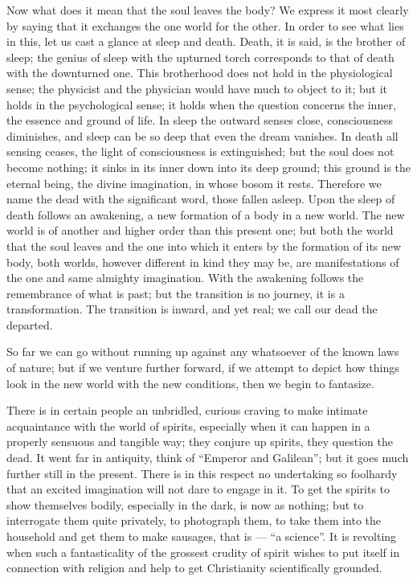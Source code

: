 \documentclass[12pt,a4paper,openany]{book}
\newcommand{\opage}[1]{\marginnote{\footnotesize\textit{[#1]}}}
\begin{document}
Now what does it mean that the soul leaves the body? We express it most clearly by saying that it exchanges the one
world for the other. In order to see what lies in this, let us cast a glance at sleep and death. Death, it is said, is
the brother of sleep; the genius of sleep with the upturned torch corresponds to that of death with the downturned one.
This brotherhood does not hold in the physiological sense; the physicist and the physician would have much to object to
it; but it holds in the psychological sense; it holds when the question concerns the inner, the essence and ground of
life. In sleep the outward senses close, consciousness diminishes, and sleep can be so deep that even the dream
vanishes. In death all sensing ceases, the light of consciousness is extinguished; but the soul does not become
nothing; it sinks in its inner down into its deep ground; this ground is the eternal being, the divine imagination, in
whose bosom it rests. Therefore we name the dead with the significant word, those fallen asleep. Upon the sleep of death
follows an awakening, a new formation of a body in a new world. The new world is of another and higher order than this
present one;
\setcounter{footnote}{0}%
\opage{25}but both the world that the soul leaves and the one into which it enters by the formation of its new body,
both worlds, however different in kind they may be, are manifestations of the one and same almighty imagination. With
the awakening follows the remembrance of what is past; but the transition is no journey, it is a transformation. The
transition is inward, and yet real; we call our dead the departed.

So far we can go without running up against any whatsoever of the known laws of nature; but if we venture further
forward, if we attempt to depict how things look in the new world with the new conditions, then we begin to fantasize.

There is in certain people an unbridled, curious craving to make intimate acquaintance with the world of spirits,
especially when it can happen in a properly sensuous and tangible way; they conjure up spirits, they question the
dead. It went far in antiquity, think of ``Emperor and Galilean''; but it goes much further still in the present.
There is in this respect no undertaking so foolhardy that an excited imagination will not dare to engage in it. To get
the spirits to show themselves bodily, especially in the dark, is now as nothing; but to interrogate them quite
privately, to photograph them, to take them into the household and get them to make sausages, that is --- ``a
science''. It is revolting when such a fantasticality of the grossest crudity of spirit wishes to put itself in
connection with religion and help to get Christianity scientifically grounded.
\end{document}

